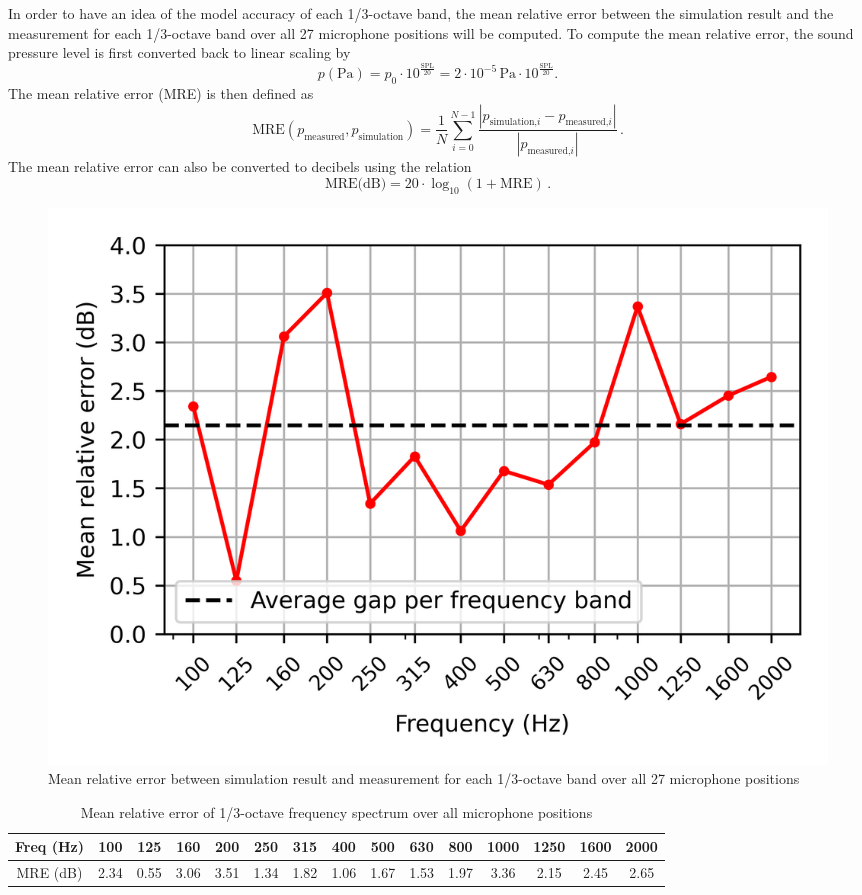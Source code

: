 In order to have an idea of the model accuracy of each 1/3-octave band, the mean relative error between the simulation result and the measurement for each 1/3-octave band over all 27 microphone positions will be computed. To compute the mean relative error, the sound pressure level is first converted back to linear scaling by
\begin{equation}
	p(\text{Pa}) = p_0 \cdot 10^{\frac{\text{SPL}}{20}} = 2\cdot10^{-5}\,\text{Pa} \cdot 10^{\frac{\text{SPL}}{20}}\text{.}
\end{equation}
The mean relative error (MRE) is then defined as
\begin{equation}
	\text{MRE}(p_{\text{measured}}, p_{\text{simulation}}) = \frac{1}{N} \sum_{i=0}^{N - 1} \frac{|p_{\text{simulation,}i} - p_{\text{measured,}i}|}{|p_{\text{measured,}i}|}\,.
\end{equation}
The mean relative error can also be converted to decibels using the relation
\begin{equation}
	\text{MRE(dB)} = 20\cdot\log_{10}(1 + \text{MRE})\,.
\end{equation}

\begin{figure}[H]
	\centering
	\includegraphics{fig/chap5/initial_model/freq_spectrum/average_gap.png}
	\caption{Mean relative error between simulation result and measurement for each 1/3-octave band over all 27 microphone positions}
	\label{fig:gap_freq_spectrum}
\end{figure}

\begin{table}[H]
	\caption{Mean relative error of 1/3-octave frequency spectrum over all microphone positions}
	\begin{tabular}{c|cccccccccccccc}
		Freq (Hz)           & 100  & 125  & 160  & 200  & 250  & 315  & 400  & 500  & 630  & 800  & 1000 & 1250 & 1600 & 2000 \\ \hline
		MRE (dB) & 2.34 & 0.55 & 3.06 & 3.51 & 1.34 & 1.82 & 1.06 & 1.67 & 1.53 & 1.97 & 3.36 & 2.15 & 2.45 & 2.65
	\end{tabular}
	\label{tab:MRE_spectra}
\end{table}

